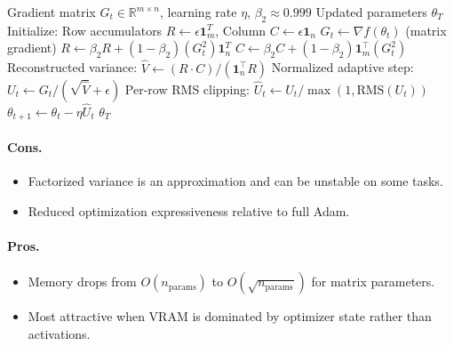 \begin{algorithm}[H]
\caption{Adafactor (Factorized Second-Moment Statistics)}
\label{alg:adafactor}
\begin{algorithmic}[1]
\Require Gradient matrix $G_t \in \mathbb{R}^{m \times n}$, learning rate $\eta$, $\beta_2 \approx 0.999$
\Ensure Updated parameters $\theta_T$
\State Initialize: Row accumulators $R \gets \epsilon \mathbf{1}^T_m$, Column $C \gets \epsilon \mathbf{1}_n$
    \State $G_t \gets \nabla f(\theta_t)$ (matrix gradient)
    \State $R \gets \beta_2 R + (1-\beta_2) (G_t^2) \mathbf{1}_n^T$ 
    \State $C \gets \beta_2 C + (1-\beta_2) \mathbf{1}_m^\top (G_t^2)$ 
    \State Reconstructed variance: $\hat{V} \gets (R \cdot C) / (\mathbf{1}_n^\top R)$ 
    \State Normalized adaptive step: $U_t \gets G_t / (\sqrt{\hat{V}} + \epsilon)$
    \State Per-row RMS clipping: $\hat{U}_t \gets U_t / \max(1, \text{RMS}(U_t))$
    \State $\theta_{t+1} \gets \theta_t - \eta \hat{U}_t$
\EndFor
\Return $\theta_T$
\end{algorithmic}
\end{algorithm}

\paragraph{Cons.}
\begin{itemize}[leftmargin=*]
\item Factorized variance is an approximation and can be unstable on some tasks.
\item Reduced optimization expressiveness relative to full Adam.
\end{itemize}

\paragraph{Pros.}
\begin{itemize}[leftmargin=*]
\item Memory drops from $O(n_{\text{params}})$ to $O(\sqrt{n_{\text{params}}})$ for matrix parameters.
\item Most attractive when VRAM is dominated by optimizer state rather than activations.
\end{itemize}

